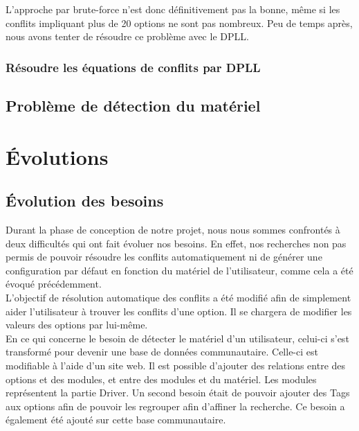 \documentclass[16pts]{report}
\begin{document}
L'approche par brute-force n'est donc définitivement pas la bonne, même si les
conflits impliquant plus de 20 options ne sont pas nombreux. Peu de temps après,
nous avons tenter de résoudre ce problème avec le DPLL.\\



            \subsubsection{Résoudre les équations de conflits par DPLL}
            \label{sub:Résoudre les équations de conflits par DPLL}

        \subsection{Problème de détection du matériel}
        \label{sub:Problème de détection du matériel}

    \section{Évolutions}
    \label{sec:Évolutions}
        \subsection{Évolution des besoins}
        \label{sec:Évolution des besoins}

Durant la phase de conception de notre projet, nous nous sommes confrontés à 
deux difficultés qui ont fait évoluer nos besoins. En effet, nos recherches 
non pas permis de pouvoir résoudre les conflits automatiquement ni de générer 
une configuration par défaut en fonction du matériel de l'utilisateur, comme
cela a été évoqué précédemment. 
\\

L'objectif de résolution automatique des conflits a été modifié afin de 
simplement aider l'utilisateur à trouver les conflits d'une option. Il se 
chargera de modifier les valeurs des options par lui-même.
\\

En ce qui concerne le besoin de détecter le matériel d'un utilisateur, celui-ci 
s'est transformé pour devenir une base de données communautaire. Celle-ci est 
modifiable à l'aide d'un site web. Il est possible d'ajouter des relations 
entre des options et des modules, et entre des modules et du matériel. Les 
modules représentent la partie Driver. Un second besoin était de pouvoir 
ajouter des Tags aux options afin de pouvoir les regrouper afin d'affiner la 
recherche. Ce besoin a également été ajouté sur cette base communautaire.
\end{document}
